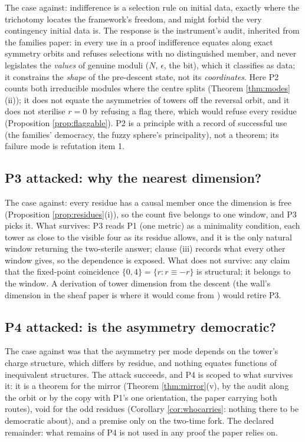 \documentclass[11pt]{article}
\theoremstyle{definition}
\begin{document}
The case against: indifference is a selection rule on initial data, exactly where the trichotomy locates the framework's freedom, and might forbid the very contingency initial data is. The response is the instrument's audit, inherited from the families paper: in every use in a proof indifference equates along exact symmetry orbits and refuses selections with no distinguished member, and never legislates the \emph{values} of genuine moduli ($N$, $\epsilon$, the bit), which it classifies as data; it constrains the \emph{shape} of the pre-descent state, not its \emph{coordinates}. Here P2 counts both irreducible modules where the centre splits (Theorem \ref{thm:modes}(ii)); it does not equate the asymmetries of towers off the reversal orbit, and it does not sterilise $r = 0$ by refusing a flag there, which would refuse every residue (Proposition \ref{prop:flaggable}). P2 is a principle with a record of successful use (the families' democracy, the fuzzy sphere's principality), not a theorem; its failure mode is refutation item 1.

\subsection*{P3 attacked: why the nearest dimension?}

The case against: every residue has a causal member once the dimension is free (Proposition \ref{prop:residues}(i)), so the count five belongs to one window, and P3 picks it. What survives: P3 reads P1 (one metric) as a minimality condition, each tower as close to the visible four as its residue allows, and it is the only natural window returning the two-sterile answer; clause (iii) records what every other window gives, so the dependence is exposed. What does not survive: any claim that the fixed-point coincidence $\{0, 4\} = \{r : r \equiv -r\}$ is structural; it belongs to the window. A derivation of tower dimension from the descent (the wall's dimension in the sheaf paper is where it would come from \cite{ButlerT4}) would retire P3.

\subsection*{P4 attacked: is the asymmetry democratic?}

The case against was that the asymmetry per mode depends on the tower's charge structure, which differs by residue, and nothing equates functions of inequivalent structures. The attack succeeds, and P4 is scoped to what survives it: it is a theorem for the mirror (Theorem \ref{thm:mirror}(v), by the audit along the orbit or by the copy with P1's one orientation, the paper carrying both routes), void for the odd residues (Corollary \ref{cor:whocarries}: nothing there to be democratic about), and a premise only on the two-time fork. The declared remainder: what remains of P4 is not used in any proof the paper relies on.
\end{document}
